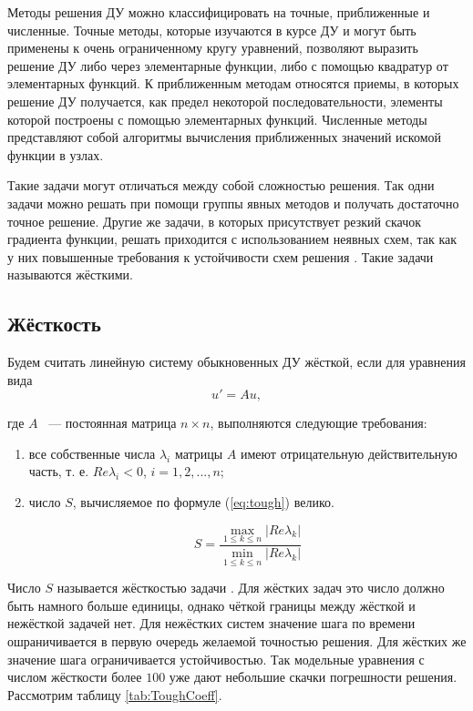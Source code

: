 Методы решения ДУ можно классифицировать на точные, приближенные и численные. Точные методы, которые изучаются
в курсе ДУ и могут быть применены к очень ограниченному кругу уравнений, позволяют выразить решение
ДУ либо через элементарные функции, либо с помощью квадратур от элементарных функций. К приближенным методам
относятся приемы, в которых решение ДУ получается, как предел некоторой последовательности, элементы которой
построены с помощью элементарных функций. Численные методы представляют собой алгоритмы вычисления приближенных значений искомой
функции в узлах. %

Такие задачи могут отличаться между собой сложностью решения. Так одни задачи можно решать при помощи группы явных методов и получать
достаточно точное решение. Другие же задачи, в которых присутствует резкий скачок градиента функции, решать приходится с использованием
неявных схем, так как у них повышенные требования к устойчивости схем решения \cite{book1}. Такие задачи называются жёсткими.

\subsection{Жёсткость}

Будем считать линейную систему обыкновенных ДУ жёсткой, если для уравнения вида
\begin{equation}
    u' = Au,
    \label{eq:SystemDU}
\end{equation}

где $A$ ~--- постоянная матрица $n \times n$,
выполняются следующие требования:

\begin{enumerate}
    \item все собственные числа $\lambda_i$ матрицы $A$ имеют отрицательную действительную часть, т. е. $Re\lambda_i < 0$, 
    $i = 1, 2, ..., n$;
    \item число $S$, вычисляемое по формуле (\ref{eq:tough}) велико.

        \begin{equation}
            S = \dfrac{\max\limits_{1 \leq k \leq n}|Re\lambda_k|}{\min\limits_{1 \leq k \leq n}|Re\lambda_k|}
            \label{eq:tough}
        \end{equation}

\end{enumerate}

Число $S$ называется жёсткостью задачи \cite{Article4, journal1}. Для жёстких задач это число должно быть намного больше единицы, однако чёткой
границы между жёсткой и нежёсткой задачей нет. Для нежёстких систем значение шага по времени ошраничивается в первую очередь желаемой
точностью решения.
Для жёстких же значение шага ограничивается устойчивостью. Так
модельные уравнения с числом жёсткости более $100$ уже дают небольшие скачки погрешности решения. Рассмотрим таблицу \ref{tab:ToughCoeff}.

